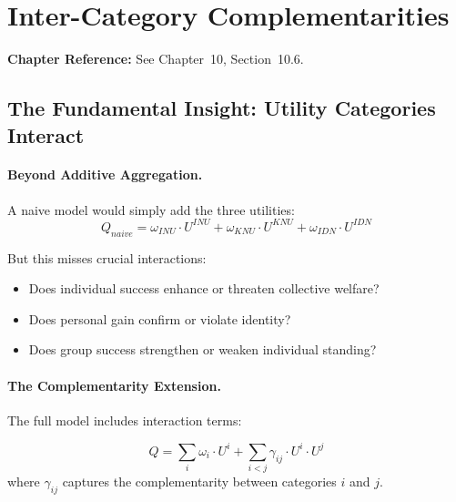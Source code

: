 \section{Inter-Category Complementarities}
\label{sec:app-c-inter-category}

\begin{cross-reference}
\textbf{Chapter Reference:} See Chapter~10, Section~10.6.
\end{cross-reference}

\subsection{The Fundamental Insight: Utility Categories Interact}

\paragraph{Beyond Additive Aggregation.}
A naive model would simply add the three utilities:
\begin{equation}
Q_{naive} = \omega_{INU} \cdot U^{INU} + \omega_{KNU} \cdot U^{KNU} + \omega_{IDN} \cdot U^{IDN}
\end{equation}

But this misses crucial interactions:
\begin{itemize}
\item Does individual success enhance or threaten collective welfare?
\item Does personal gain confirm or violate identity?
\item Does group success strengthen or weaken individual standing?
\end{itemize}

\paragraph{The Complementarity Extension.}
The full model includes interaction terms:

\begin{tcolorbox}[colback=blue!5!white, colframe=blue!50!black]
\begin{equation}
\boxed{
Q = \sum_{i} \omega_i \cdot U^i + \sum_{i < j} \gamma_{ij} \cdot U^i \cdot U^j
}
\label{eq:app-c-complementarity-model}
\end{equation}
where $\gamma_{ij}$ captures the complementarity between categories $i$ and $j$.
\end{tcolorbox}

